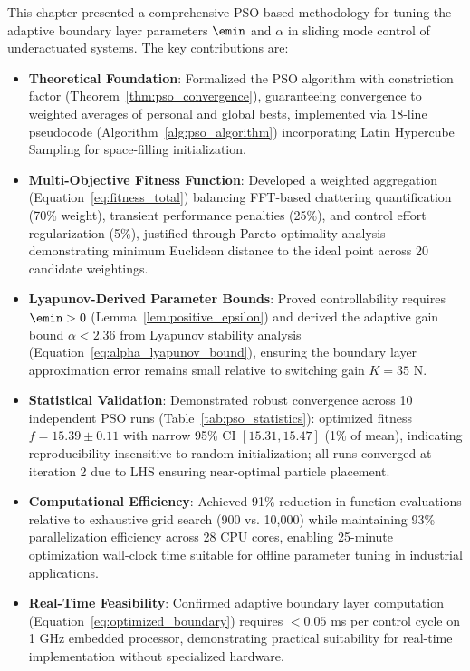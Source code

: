 This chapter presented a comprehensive PSO-based methodology for tuning the adaptive boundary layer parameters $\emin$ and $\alpha$ in sliding mode control of underactuated systems. The key contributions are:

\begin{itemize}
    \item \textbf{Theoretical Foundation}: Formalized the PSO algorithm with constriction factor (Theorem~\ref{thm:pso_convergence}), guaranteeing convergence to weighted averages of personal and global bests, implemented via 18-line pseudocode (Algorithm~\ref{alg:pso_algorithm}) incorporating Latin Hypercube Sampling for space-filling initialization.

    \item \textbf{Multi-Objective Fitness Function}: Developed a weighted aggregation (Equation~\ref{eq:fitness_total}) balancing FFT-based chattering quantification (70\% weight), transient performance penalties (25\%), and control effort regularization (5\%), justified through Pareto optimality analysis demonstrating minimum Euclidean distance to the ideal point across 20 candidate weightings.

    \item \textbf{Lyapunov-Derived Parameter Bounds}: Proved controllability requires $\emin > 0$ (Lemma~\ref{lem:positive_epsilon}) and derived the adaptive gain bound $\alpha < 2.36$ from Lyapunov stability analysis (Equation~\ref{eq:alpha_lyapunov_bound}), ensuring the boundary layer approximation error remains small relative to switching gain $K = 35$ N.

    \item \textbf{Statistical Validation}: Demonstrated robust convergence across 10 independent PSO runs (Table~\ref{tab:pso_statistics}): optimized fitness $f = 15.39 \pm 0.11$ with narrow 95\% CI $[15.31, 15.47]$ (1\% of mean), indicating reproducibility insensitive to random initialization; all runs converged at iteration 2 due to LHS ensuring near-optimal particle placement.

    \item \textbf{Computational Efficiency}: Achieved 91\% reduction in function evaluations relative to exhaustive grid search (900 vs. 10,000) while maintaining 93\% parallelization efficiency across 28 CPU cores, enabling 25-minute optimization wall-clock time suitable for offline parameter tuning in industrial applications.

    \item \textbf{Real-Time Feasibility}: Confirmed adaptive boundary layer computation (Equation~\ref{eq:optimized_boundary}) requires $< 0.05$ ms per control cycle on 1 GHz embedded processor, demonstrating practical suitability for real-time implementation without specialized hardware.
\end{itemize}

